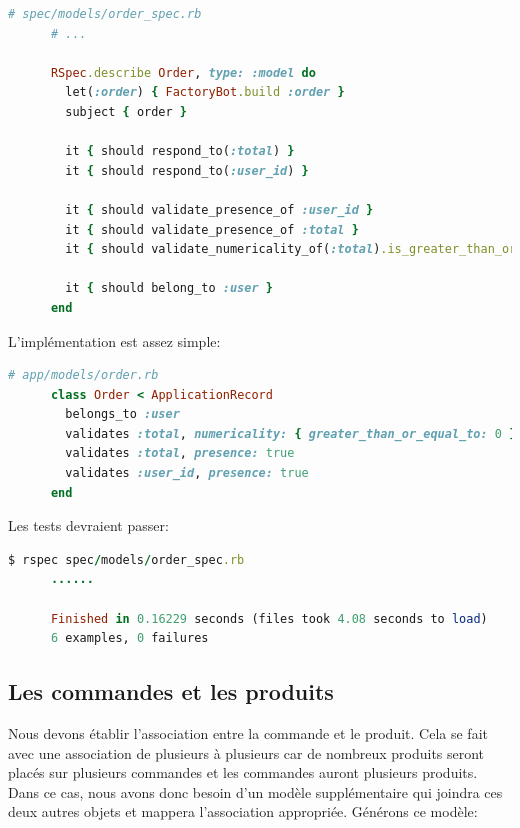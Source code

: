 \documentclass[]{report}
\begin{document}
    \begin{scriptsize}
      \begin{lstlisting}[language=ruby, caption={Premiers tests du modèle de commande}]
      # spec/models/order_spec.rb
      # ...

      RSpec.describe Order, type: :model do
        let(:order) { FactoryBot.build :order }
        subject { order }

        it { should respond_to(:total) }
        it { should respond_to(:user_id) }

        it { should validate_presence_of :user_id }
        it { should validate_presence_of :total }
        it { should validate_numericality_of(:total).is_greater_than_or_equal_to(0) }

        it { should belong_to :user }
      end
      \end{lstlisting}
    \end{scriptsize}

    L'implémentation est assez simple:

    \begin{scriptsize}
      \begin{lstlisting}[language=ruby, caption={Validateurs du modèle de commande}]
      # app/models/order.rb
      class Order < ApplicationRecord
        belongs_to :user
        validates :total, numericality: { greater_than_or_equal_to: 0 }
        validates :total, presence: true
        validates :user_id, presence: true
      end
      \end{lstlisting}
    \end{scriptsize}

    Les tests devraient passer:

    \begin{scriptsize}
      \begin{lstlisting}[language=ruby, caption={Validateurs du modèle de commande}]
      $ rspec spec/models/order_spec.rb
      ......

      Finished in 0.16229 seconds (files took 4.08 seconds to load)
      6 examples, 0 failures
      \end{lstlisting}
    \end{scriptsize}

    \subsection{Les commandes et les produits}

      Nous devons établir l'association entre la commande et le produit. Cela se fait avec une association de plusieurs à plusieurs car de nombreux produits seront placés sur plusieurs commandes et les commandes auront plusieurs produits. Dans ce cas, nous avons donc besoin d'un modèle supplémentaire qui joindra ces deux autres objets et mappera l'association appropriée. Générons ce modèle:
\end{document}
